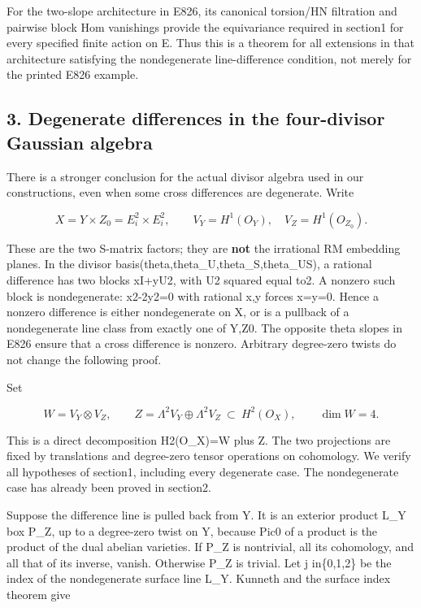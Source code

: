 For the two-slope architecture in E826, its canonical torsion/HN filtration
and pairwise block Hom vanishings provide the equivariance required in
section1 for every specified finite action on E. Thus this is a theorem for
all extensions in that architecture satisfying the nondegenerate
line-difference condition, not merely for the printed E826 example.

\subsection{3. Degenerate differences in the four-divisor Gaussian
algebra}\label{SF-E827:degenerate-differences-in-the-four-divisor-gaussian-algebra}

There is a stronger conclusion for the actual divisor algebra used in our
constructions, even when some cross differences are degenerate. Write

\[
 X=Y\times Z_0=E_i^2\times E_i^2,
 \qquad V_Y=H^1(O_Y),\quad V_Z=H^1(O_{Z_0}).
 \tag{E827.7}
\]

These are the two S-matrix factors; they are \textbf{not} the irrational RM
embedding planes. In the divisor basis(theta,theta\_U,theta\_S,theta\_US), a
rational difference has two blocks xI+yU2, with U2 squared equal to2. A
nonzero such block is nondegenerate: x2-2y2=0 with rational x,y forces
x=y=0. Hence a nonzero difference is either nondegenerate on X, or is a
pullback of a nondegenerate line class from exactly one of Y,Z0. The
opposite theta slopes in E826 ensure that a cross difference is nonzero.
Arbitrary degree-zero twists do not change the following proof.

Set

\[
 W=V_Y\otimes V_Z,\qquad
 Z=\Lambda^2V_Y\oplus\Lambda^2V_Z
       \ \subset\ H^2(O_X),\qquad\dim W=4.
 \tag{E827.8}
\]

This is a direct decomposition H2(O\_X)=W plus Z. The two projections are
fixed by translations and degree-zero tensor operations on cohomology. We
verify all hypotheses of section1, including every degenerate case. The
nondegenerate case has already been proved in section2.

Suppose the difference line is pulled back from Y. It is an exterior product
L\_Y box P\_Z, up to a degree-zero twist on Y, because Pic0 of a product is
the product of the dual abelian varieties. If P\_Z is nontrivial, all its
cohomology, and all that of its inverse, vanish. Otherwise P\_Z is trivial.
Let j in\{0,1,2\} be the index of the nondegenerate surface line L\_Y.
Kunneth and the surface index theorem give

